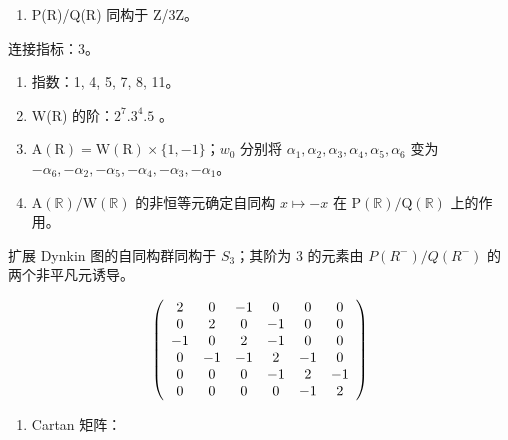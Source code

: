 \begin{enumerate}
\def\labelenumi{(\Roman{enumi})}
\setcounter{enumi}{7}
\tightlist
\item
  P(R)/Q(R) 同构于 Z/3Z。
\end{enumerate}

连接指标：3。

\begin{enumerate}
\def\labelenumi{(\Roman{enumi})}
\setcounter{enumi}{8}
\item
  指数：1, 4, 5, 7, 8, 11。
\item
  W(R) 的阶：\(2^{7}.3^{4}.5\) 。
\item
  \(\mathrm{A}(\mathrm{R}) = \mathrm{W}(\mathrm{R}) \times \{1, -1\}\)；\(w_0\) 分别将 \(\alpha_1, \alpha_2, \alpha_3, \alpha_4, \alpha_5, \alpha_6\) 变为 \(-\alpha_6, -\alpha_2, -\alpha_5, -\alpha_4, -\alpha_3, -\alpha_1\)。
\item
  \(\mathrm{A}(\mathbb{R}) / \mathrm{W}(\mathbb{R})\) 的非恒等元确定自同构 \(x \mapsto -x\) 在 \(\mathrm{P}(\mathbb{R}) / \mathrm{Q}(\mathbb{R})\) 上的作用。
\end{enumerate}

扩展 Dynkin 图的自同构群同构于 \(S_{3}\)；其阶为 3 的元素由 \(P(R^{-})/Q(R^{-})\) 的两个非平凡元诱导。

\[
\left( \begin{array}{c c c c c c} 2 & 0 & - 1 & 0 & 0 & 0 \\ 0 & 2 & 0 & - 1 & 0 & 0 \\ - 1 & 0 & 2 & - 1 & 0 & 0 \\ 0 & - 1 & - 1 & 2 & - 1 & 0 \\ 0 & 0 & 0 & - 1 & 2 & - 1 \\ 0 & 0 & 0 & 0 & - 1 & 2 \end{array} \right)
\]

\begin{enumerate}
\def\labelenumi{(\Roman{enumi})}
\setcounter{enumi}{12}
\tightlist
\item
  Cartan 矩阵：
\end{enumerate}

